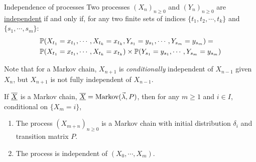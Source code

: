 \documentclass[../Main.tex]{subfiles}
\begin{document}
\begin{definition}{Independence of processes}
    Two processes $(X_n)_{n \geq 0}$ and $(Y_n)_{n \geq 0}$ are \underline{independent} if and only if, for any two finite sets of indices $\{t_1, t_2, \cdots, t_k\}$ and $\{s_1, \cdots, s_m\}$:
    \begin{align*}
        &\P(X_{t_1} = x_{t_1}, \cdots, X_{t_k} = x_{t_k}, Y_{s_1} = y_{s_1}, \cdots, Y_{s_m} = y_{s_m}) = \\
        &\P(X_{t_1} = x_{t_1}, \cdots, X_{t_k} = x_{t_k}) \times \P(Y_{s_1} = y_{s_1}, \cdots, Y_{s_m} = y_{s_m})
    \end{align*}
\end{definition}
Note that for a Markov chain, $X_{n+1}$ is \textit{conditionally} independent of $X_{n-1}$ given $X_n$, but $X_{n+1}$ is not fully independent of $X_{n-1}$.
\begin{theorem}
    If $\chain{X}$ is a Markov chain, $\chain{X} = \text{Markov}(\vec{\lambda}, P)$, then for any $m \geq 1$ and $i \in I$, conditional on $\{X_m = i\}$,
    \begin{enumerate}
        \item The process $(X_{m + n})_{n \geq 0}$ is a Markov chain with initial distribution $\delta_i$ and transition matrix $P$.
        \item The process is independent of $(X_0, \cdots, X_m)$.
    \end{enumerate}
    \label{thmMarkovProperty}
\end{theorem}
\end{document}

